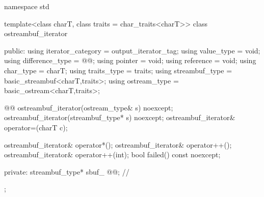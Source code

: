 
%
\begin{codeblock}
namespace std {
  template<class charT, class traits = char_traits<charT>>
  class ostreambuf_iterator {
  public:
    using iterator_category = output_iterator_tag;
    using value_type        = void;
    using difference_type   = @@;
    using pointer           = void;
    using reference         = void;
    using char_type         = charT;
    using traits_type       = traits;
    using streambuf_type    = basic_streambuf<charT,traits>;
    using ostream_type      = basic_ostream<charT,traits>;

    @@
    ostreambuf_iterator(ostream_type& s) noexcept;
    ostreambuf_iterator(streambuf_type* s) noexcept;
    ostreambuf_iterator& operator=(charT c);

    ostreambuf_iterator& operator*();
    ostreambuf_iterator& operator++();
    ostreambuf_iterator& operator++(int);
    bool failed() const noexcept;

  private:
    streambuf_type* sbuf_ @@;                // \expos
  };
}
\end{codeblock}


